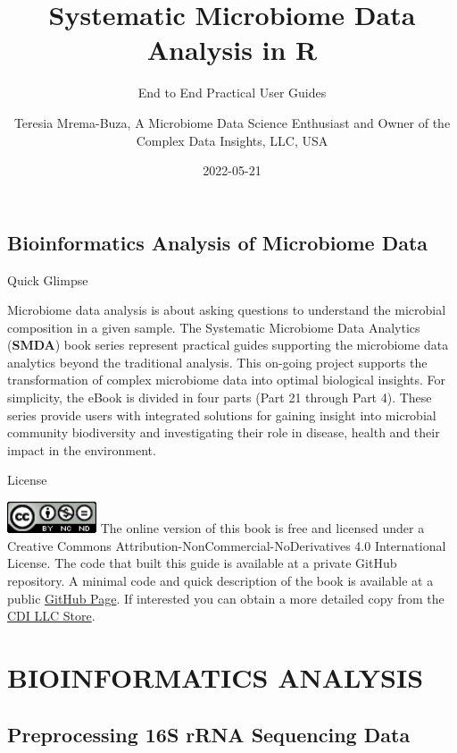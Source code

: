 \documentclass[
  12pt,
  openany]{book}
\title{Systematic Microbiome Data Analysis in R}
\subtitle{End to End Practical User Guides}
\author{Teresia Mrema-Buza, A Microbiome Data Science Enthusiast and Owner of the Complex Data Insights, LLC, USA}
\date{2022-05-21}
\begin{document}
\maketitle

{
\hypersetup{linkcolor=}
\setcounter{tocdepth}{1}
\tableofcontents
}
\hypertarget{frontpage}{%
\chapter*{Bioinformatics Analysis of Microbiome Data}\label{frontpage}}

Quick Glimpse

Microbiome data analysis is about asking questions to understand the microbial composition in a given sample. The Systematic Microbiome Data Analytics (\textbf{SMDA}) book series represent practical guides supporting the microbiome data analytics beyond the traditional analysis. This on-going project supports the transformation of complex microbiome data into optimal biological insights. For simplicity, the eBook is divided in four parts (Part 21 through Part 4). These series provide users with integrated solutions for gaining insight into microbial community biodiversity and investigating their role in disease, health and their impact in the environment.

License

\includegraphics[width=1.04167in,height=\textheight]{images/CCbyNCND.png} The online version of this book is free and licensed under a Creative Commons Attribution-NonCommercial-NoDerivatives 4.0 International License. The code that built this guide is available at a private GitHub repository. A minimal code and quick description of the book is available at a public \href{https://tmbuza.github.io/Systematic-Microbiome-Data-Analysis/}{GitHub Page}. If interested you can obtain a more detailed copy from the \href{https://complexdatainsights.com/products}{CDI LLC Store}.

\hypertarget{part-bioinformatics-analysis}{%
\part{BIOINFORMATICS ANALYSIS}\label{part-bioinformatics-analysis}}

\hypertarget{preprocessing-16S-reads}{%
\chapter{Preprocessing 16S rRNA Sequencing Data}\label{preprocessing-16S-reads}}
\end{document}
